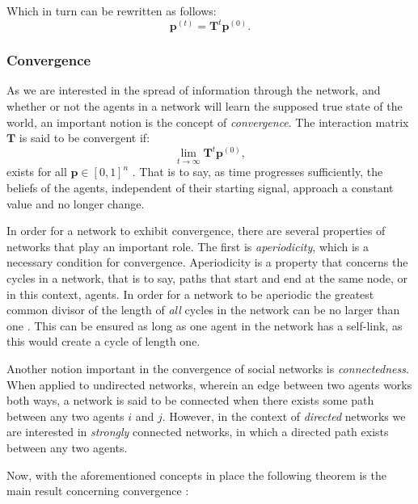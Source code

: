 \documentclass[a4paper, 12pt]{report}
\newcommand{\T}{\bm{T}}
\begin{document}
\noindent Which in turn can be rewritten as follows:
\begin{equation*}
    \label{updating:alt}
    \bm{p}^{(t)} = \T^{t}\bm{p}^{(0)}.
\end{equation*}

\newpage

\subsubsection{Convergence}
\label{convergence:general}
As we are interested in the spread of information through the network, and whether or not the agents in a network will learn the supposed true state of the world, an important notion is the concept of \emph{convergence}. The interaction matrix $\T$ is said to be convergent if:
\begin{equation*}
    \lim_{t\to\infty} \T^t\bm{p}^{(0)},
\end{equation*}
exists for all $\bm{p} \in [0, 1]^n$ \parencite{degroot1974concensus}. That is to say, as time progresses sufficiently, the beliefs of the agents, independent of their starting signal, approach a constant value and no longer change.

\noindent In order for a network to exhibit convergence, there are several properties of networks that play an important role. The first is \emph{aperiodicity}, which is a necessary condition for convergence. Aperiodicity is a property that concerns the cycles in a network, that is to say, paths that start and end at the same node, or in this context, agents. In order for a network to be aperiodic the greatest common divisor of the length of \emph{all} cycles in the network can be no larger than one \parencite{degroot1974concensus}. This can be ensured as long as one agent in the network has a self-link, as this would create a cycle of length one.

\noindent Another notion important in the convergence of social networks is \emph{connectedness}. When applied to undirected networks, wherein an edge between two agents works both ways, a network is said to be connected when there exists some path between any two agents $i$ and $j$. However, in the context of \emph{directed} networks we are interested in \emph{strongly} connected networks, in which a directed path exists between any two agents.

\noindent Now, with the aforementioned concepts in place the following theorem is the main result concerning convergence \parencite{degroot1974concensus}:
\end{document}
